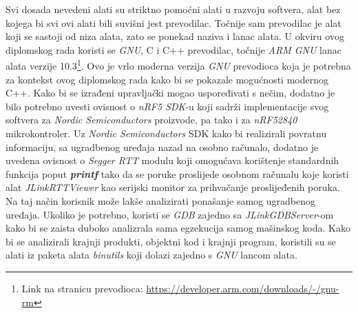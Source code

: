 Svi dosada nevedeni alati su striktno pomoćni alati u razvoju softvera, alat bez kojega bi svi ovi alati bili suvišni jest prevodilac. Točnije sam prevodilac je alat koji se sastoji od niza alata, zato se ponekad naziva i lanac alata. U okviru ovog diplomskog rada koristi se \textit{GNU}, C i C++ prevodilac, točnije \textit{ARM GNU} lanac alata verzije 10.3\footnote{Link na stranicu prevodioca: \hyperref[https://developer.arm.com/downloads/-/gnu-rm]{https://developer.arm.com/downloads/-/gnu-rm}}. Ovo je vrlo moderna verzija \textit{GNU} prevodioca koja je potrebna za kontekst ovog diplomskog rada kako bi se pokazale mogućnosti modernog C++. Kako bi se izrađeni upravljački mogao uspoređivati s nečim, dodatno je bilo potrebno uvesti ovisnost o \textit{nRF5 SDK}-u koji sadrži implementacije svog softvera za \textit{Nordic Semiconductors} proizvode, pa tako i za \textit{nRF52840} mikrokontroler. Uz \textit{Nordic Semiconductors} SDK kako bi realizirali povratnu informaciju, sa ugradbenog uređaja nazad na osobno računalo, dodatno je uvedena ovisnost o \textit{Segger RTT} modulu koji omogućava korištenje standardnih funkcija poput \textbf{\textit{printf}} tako da se poruke proslijede osobnom računalu koje koristi alat \textit{JLinkRTTViewer} kao serijski monitor za prihvačanje proslijeđenih poruka. Na taj način korisnik može lakše analizirati ponašanje samog ugradbenog uređaja. Ukoliko je potrebno, koristi se \textit{GDB} zajedno sa \textit{JLinkGDBServer}-om kako bi se zaista duboko analizrala sama egzekucija samog mašinskog koda. Kako bi se analizirali krajnji produkti, objektni kod i krajnji program, koristili su se alati iz paketa alata \textit{binutils} koji dolazi zajedno s \textit{GNU} lancom alata. 